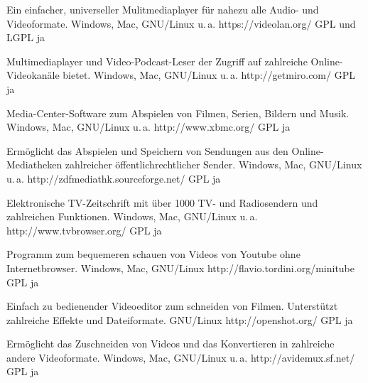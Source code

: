 




{Ein einfacher, universeller Mulitmediaplayer für nahezu alle Audio- und Videoformate.}
{Windows, Mac, GNU/Linux u.\,a.}
{https://videolan.org/}
{GPL und LGPL}
{ja}

{Multimediaplayer und Video-Podcast-Leser der Zugriff auf zahlreiche Online-Videokanäle bietet.}
{Windows, Mac, GNU/Linux u.\,a.}
{http://getmiro.com/}
{GPL}
{ja}

{Media-Center-Software zum Abspielen von Filmen, Serien, Bildern und Musik.}
{Windows, Mac, GNU/Linux u.\,a.}
{http://www.xbmc.org/}
{GPL}
{ja}

{Ermöglicht das Abspielen und Speichern von Sendungen aus den Online-Mediatheken zahlreicher öffentlichrechtlicher Sender.}
{Windows, Mac, GNU/Linux u.\,a.}
{http://zdfmediathk.sourceforge.net/}
{GPL}
{ja}


{Elektronische TV-Zeitschrift mit über 1000 TV- und Radiosendern und zahlreichen Funktionen.}
{Windows, Mac, GNU/Linux u.\,a.}
{http://www.tvbrowser.org/}
{GPL}
{ja}

{Programm zum bequemeren schauen von Videos von Youtube ohne Internetbrowser.}
{Windows, Mac, GNU/Linux}
{http://flavio.tordini.org/minitube}
{GPL}
{ja}

{Einfach zu bedienender Videoeditor zum schneiden von Filmen. Unterstützt zahlreiche Effekte und Dateiformate.}
{GNU/Linux}
{http://openshot.org/}
{GPL}
{ja}

{Ermöglicht das Zuschneiden von Videos und das Konvertieren in zahlreiche andere Videoformate.}
{Windows, Mac, GNU/Linux u.\,a.}
{http://avidemux.sf.net/}
{GPL}
{ja}

\backpage

